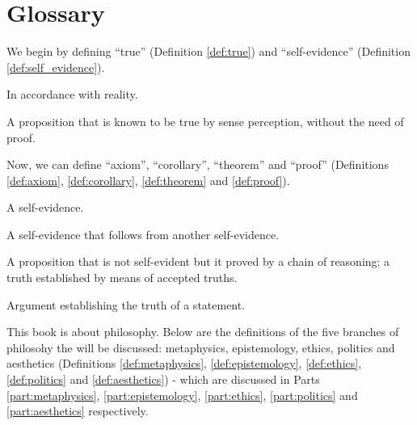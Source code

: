 \chapter{Glossary}

     We begin by defining ``true'' (Definition \ref{def:true}) and ``self-evidence'' (Definition \ref{def:self_evidence}).

        \begin{definition}[True]
        \label{def:true}
            In accordance with reality.
        \end{definition}

        \begin{definition}
        \label{def:self_evidence}
            A proposition that is known to be true by sense perception, without the need of proof.
        \end{definition}

    Now, we can define ``axiom'', ``corollary'', ``theorem'' and ``proof'' (Definitions \ref{def:axiom}, \ref{def:corollary}, \ref{def:theorem} and \ref{def:proof}).

        \begin{definition}[Axiom]
        \label{def:axiom}
            A self-evidence.
        \end{definition}

        \begin{definition}[Corollary]
        \label{def:corollary}
            A self-evidence that follows from another self-evidence.
        \end{definition}

        \begin{definition}[Theorem]
        \label{def:theorem}
            A proposition that is not self-evident but it proved by a chain of reasoning; a truth established by means of accepted truths.
        \end{definition}

        \begin{definition}[Proof]
        \label{def:proof}
            Argument establishing the truth of a statement.
        \end{definition}

    This book is about philosophy. Below are the definitions of the five branches of philosohy the will be discussed: metaphysics, epistemology, ethics, politics and aesthetics (Definitions \ref{def:metaphysics}, \ref{def:epistemology}, \ref{def:ethics}, \ref{def:politics} and \ref{def:aesthetics}) - which are discussed in Parts \ref{part:metaphysics}, \ref{part:epistemology}, \ref{part:ethics}, \ref{part:politics} and \ref{part:aesthetics} respectively.

